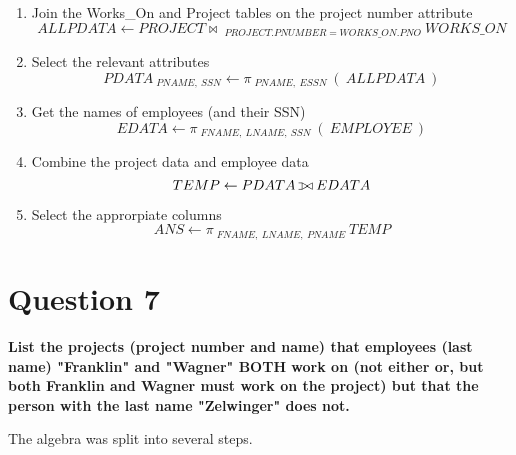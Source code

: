 \documentclass{article}
\def\ojoin{\setbox0=\hbox{$\bowtie$}%
  \rule[-.02ex]{.25em}{.4pt}\llap{\rule[\ht0]{.25em}{.4pt}}}
\def\leftouterjoin{\mathbin{\ojoin\mkern-5.8mu\bowtie}}
\begin{document}
    \begin{enumerate}
        \item Join the Works\_On and Project tables on the project number attribute
        \[ ALLPDATA \gets PROJECT \bowtie \: _{PROJECT.PNUMBER = WORKS\_ON.PNO} \: WORKS\_ON \]
        \item Select the relevant attributes
        \[ PDATA \: _{PNAME, \: SSN} \gets \pi \: _{PNAME, \: ESSN} \: ( \: ALLPDATA \: ) \]
        \item Get the names of employees (and their SSN)
        \[ EDATA \gets \pi \: _{FNAME, \: LNAME, \: SSN} \: ( \: EMPLOYEE \: ) \]
        \item Combine the project data and employee data
        \[ TEMP \gets PDATA \leftouterjoin EDATA \]
        \item Select the approrpiate columns
        \[ ANS \gets \pi \: _{FNAME, \: LNAME, \: PNAME} \: TEMP \]
    \end{enumerate}

\section{Question 7}

    \textbf{List the projects (project number and name) that employees (last name)  "Franklin" and "Wagner" BOTH work on (not either or, but both Franklin and Wagner must work on the project) but that the person with the last name "Zelwinger" does not.}
    
    The algebra was split into several steps.
\end{document}
